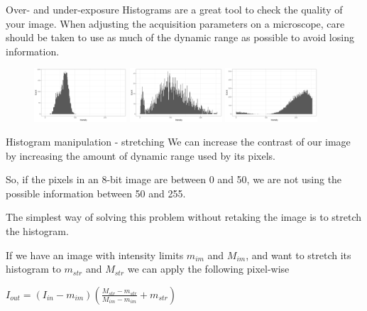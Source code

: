 \documentclass[9pt, aspectratio=169]{beamer}
\begin{document}
\begin{frame}
	{Over- and under-exposure}
	Histograms are a great tool to check the quality of your image. When adjusting the acquisition parameters on a microscope, care should be taken to use as much of the dynamic range as possible to avoid losing information.
	\begin{figure}
		\centering
		\includegraphics[width=130px]{underexposed.png}
		\includegraphics[width=130px]{normalexp.png}
		\includegraphics[width=130px]{overexposed.png}
	\end{figure}
\end{frame}

\begin{frame}
	{Histogram manipulation - stretching}
	We can increase the contrast of our image by increasing the amount of dynamic range used by its pixels.

	So, if the pixels in an 8-bit image are between 0 and 50, we are not using the possible information between 50 and 255.

	\pause

	The simplest way of solving this problem without retaking the image is to stretch the histogram.

	If we have an image with intensity limits $m_{im}$ and $M_{im}$, and want to stretch its histogram to $m_{str}$ and $M_{str}$ we can apply the following pixel-wise

	\huge
	$I_{out} = (I_{in} - m_{im})(\frac{M_{str}-m_{str}}{M_{im}-m_{im}} + m_{str})$
\end{frame}
\end{document}
